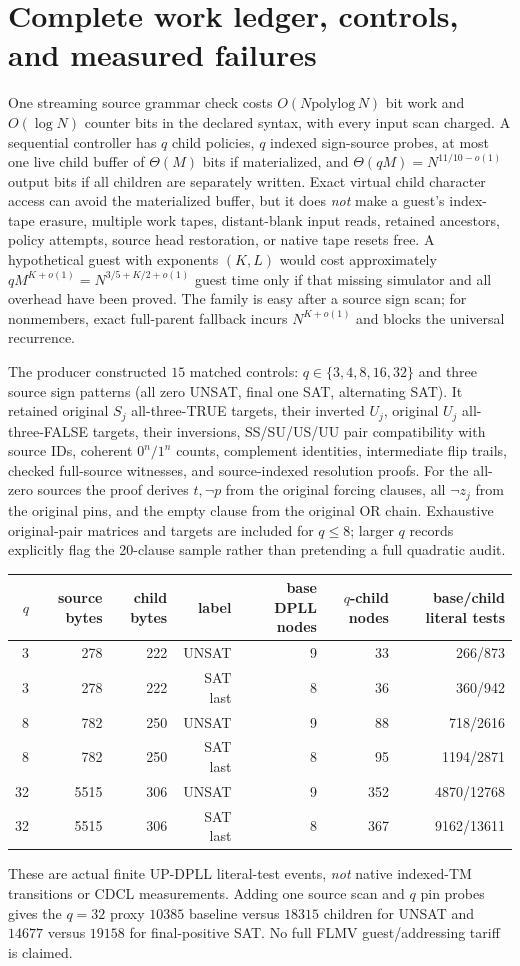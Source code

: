 \documentclass[11pt]{article}
\begin{document}
\section{Complete work ledger, controls, and measured failures}
One streaming source grammar check costs $O(N\mathrm{polylog}\,N)$ bit work and $O(\log N)$ counter bits in the declared syntax, with every input scan charged. A sequential controller has $q$ child policies, $q$ indexed sign-source probes, at most one live child buffer of $\Theta(M)$ bits if materialized, and $\Theta(qM)=N^{11/10-o(1)}$ output bits if all children are separately written. Exact virtual child character access can avoid the materialized buffer, but it does \emph{not} make a guest's index-tape erasure, multiple work tapes, distant-blank input reads, retained ancestors, policy attempts, source head restoration, or native tape resets free. A hypothetical guest with exponents $(K,L)$ would cost approximately $qM^{K+o(1)}=N^{3/5+K/2+o(1)}$ guest time only if that missing simulator and all overhead have been proved. The family is easy after a source sign scan; for nonmembers, exact full-parent fallback incurs $N^{K+o(1)}$ and blocks the universal recurrence.

The producer constructed $15$ matched controls: $q\in\{3,4,8,16,32\}$ and three source sign patterns (all zero UNSAT, final one SAT, alternating SAT). It retained original $S_j$ all-three-TRUE targets, their inverted $U_j$, original $U_j$ all-three-FALSE targets, their inversions, SS/SU/US/UU pair compatibility with source IDs, coherent $0^n/1^n$ counts, complement identities, intermediate flip trails, checked full-source witnesses, and source-indexed resolution proofs. For the all-zero sources the proof derives $t,\neg p$ from the original forcing clauses, all $\neg z_j$ from the original pins, and the empty clause from the original OR chain. Exhaustive original-pair matrices and targets are included for $q\le8$; larger $q$ records explicitly flag the 20-clause sample rather than pretending a full quadratic audit.

\begin{center}\small\begin{tabular}{rrrrrrr}\toprule
$q$&source bytes&child bytes&label&base DPLL nodes&$q$-child nodes&base/child literal tests\\\midrule
3&278&222&UNSAT&9&33&266/873\\
3&278&222&SAT last&8&36&360/942\\
8&782&250&UNSAT&9&88&718/2616\\
8&782&250&SAT last&8&95&1194/2871\\
32&5515&306&UNSAT&9&352&4870/12768\\
32&5515&306&SAT last&8&367&9162/13611\\\bottomrule\end{tabular}\end{center}
These are actual finite UP-DPLL literal-test events, \emph{not} native indexed-TM transitions or CDCL measurements. Adding one source scan and $q$ pin probes gives the $q=32$ proxy $10385$ baseline versus $18315$ children for UNSAT and $14677$ versus $19158$ for final-positive SAT. No full FLMV guest/addressing tariff is claimed.
\end{document}
